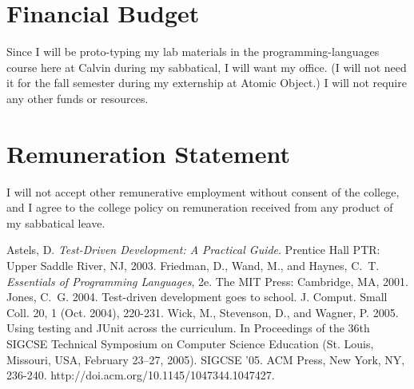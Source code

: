 \documentclass{article}
\begin{document}

\section*{Financial Budget}

Since I will be proto-typing my lab materials in the programming-languages course here at Calvin during my sabbatical, I will want my office.  (I will not need it for the fall semester during my externship at Atomic Object.)  I will not require any other funds or resources.


\section*{Remuneration Statement}

I will not accept other remunerative employment without consent of the college, and I agree to the college policy on remuneration received from any product of my sabbatical leave.

\begin{thebibliography}{99}
   Astels, D.  \textit{Test-Driven Development: A Practical Guide}.  Prentice Hall PTR: Upper Saddle River, NJ, 2003.
   Friedman, D., Wand, M., and Haynes, C.~T.  \textit{Essentials of Programming Languages}, 2e.  The MIT Press: Cambridge, MA, 2001.
   Jones, C.~G. 2004. Test-driven development goes to school. J. Comput. Small Coll. 20, 1 (Oct. 2004), 220-231. 
   Wick, M., Stevenson, D., and Wagner, P. 2005. Using testing and JUnit across the curriculum. In Proceedings of the 36th SIGCSE Technical Symposium on Computer Science Education (St. Louis, Missouri, USA, February 23--27, 2005). SIGCSE '05. ACM Press, New York, NY, 236-240. http://doi.acm.org/10.1145/1047344.1047427.
\end{thebibliography}
\end{document}
